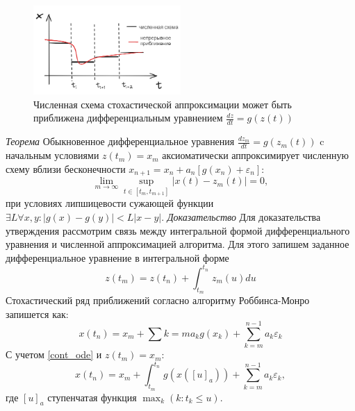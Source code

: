 \begin{figure}[h]
    \centering
    \includegraphics[width=0.5\textwidth]{assets/math/approx/cont_vs_discrete.excalidraw.png}
    \caption{Численная схема стохастической аппроксимации может быть приближена дифференциальным уравнением  $\frac{d z}{d t} = g(z(t))$ }
    \label{continuiation}
\end{figure}

\textit{Теорема} Обыкновенное дифференциальное уравнения $\frac{d z_m}{d t} = g(z_m(t))$ c начальным условиями $z(t_m )=x_m$ аксиоматически аппроксимирует
численную схему вблизи бесконечности $x_{n+1} = x_n + a_n \left[g(x_n) + \varepsilon_n \right]$:
$$
    \lim_{m \rightarrow \infty} \sup_{t \in [t_m, t_{m+1} ] } |x(t) - z_m(t)|=0, 
$$
при условиях липшицевости сужающей функции  $\exists L \forall x,y: |g(x) - g(y)| < L |x-y|$.
\textit{Доказательство} Для доказательства утверждения рассмотрим связь между интегральной формой дифференциального уравнения и численной
аппроксимацией алгоритма. Для этого запишем заданное дифференциальное уравнение в интегральной форме
\begin{equation}
    z(t_m) = z(t_n) + \int_{t_m}^{t_n} z_m(u)du
    \label{cont_ode}
\end{equation}
Стохастический ряд приближений согласно алгоритму Роббинса-Монро запишется как:
\begin{equation}
    x(t_n) = x_m + \sum{k=m} a_k g(x_k) + \sum_{k=m}^{n-1} a_k \varepsilon_k 
\end{equation}
С учетом \ref{cont_ode} и  $z(t_m)=x_m$:
\begin{equation}
    x(t_n) = x_m + \int_{t_m}^{t_n} g(x([u]_a)) + \sum_{k=m}^{n-1} a_k \varepsilon_k, 
\end{equation}
где $[u]_a$ ступенчатая функция $\max_k(k: t_k \le u)$. 

